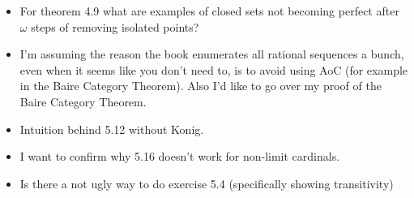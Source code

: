 \documentclass{article}
\theoremstyle{definition}
\begin{document}
\begin{itemize}
    \item For theorem 4.9 what are examples of closed sets not becoming perfect after $\omega$ steps of removing isolated points?
    \item I'm assuming the reason the book enumerates all rational sequences a bunch, even when it seems like you don't need to, is to avoid using AoC (for example in the Baire Category Theorem). Also I'd like to go over my proof of the Baire Category Theorem.
    \item Intuition behind 5.12 without Konig.
    \item I want to confirm why 5.16 doesn't work for non-limit cardinals.
    \item Is there a not ugly way to do exercise 5.4 (specifically showing transitivity)
\end{itemize}
\end{document}
